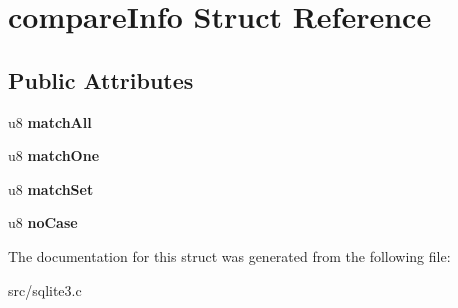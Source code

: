 \hypertarget{structcompare_info}{\section{compare\-Info Struct Reference}
\label{structcompare_info}
}
\subsection*{Public Attributes}
\begin{DoxyCompactItemize}
\item 
\hypertarget{structcompare_info_a1161e850029ef556e6daee856d32b2e2}{u8 {\bfseries match\-All}}\label{structcompare_info_a1161e850029ef556e6daee856d32b2e2}

\item 
\hypertarget{structcompare_info_ab9aabbf6d3df26bad786b532330a2fd7}{u8 {\bfseries match\-One}}\label{structcompare_info_ab9aabbf6d3df26bad786b532330a2fd7}

\item 
\hypertarget{structcompare_info_a5d2ff58a72c9eb7d22f18915c1751655}{u8 {\bfseries match\-Set}}\label{structcompare_info_a5d2ff58a72c9eb7d22f18915c1751655}

\item 
\hypertarget{structcompare_info_a6de76861b066547321f7a255cb7042ab}{u8 {\bfseries no\-Case}}\label{structcompare_info_a6de76861b066547321f7a255cb7042ab}

\end{DoxyCompactItemize}


The documentation for this struct was generated from the following file\-:\begin{DoxyCompactItemize}
\item 
src/sqlite3.\-c\end{DoxyCompactItemize}
